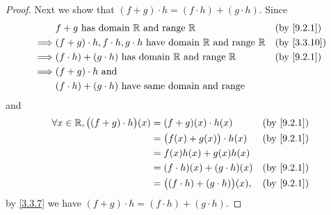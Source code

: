 \begin{proof}
  Next we show that \((f + g) \cdot h = (f \cdot h) + (g \cdot h)\).
  Since
  \begin{align*}
             & f + g \text{ has domain } \R \text{ and range } \R                                   &  & \text{(by \cref{9.2.1})}  \\
    \implies & (f + g) \cdot h, f \cdot h, g \cdot h  \text{ have domain } \R \text{ and range } \R &  & \text{(by \cref{3.3.10})} \\
    \implies & (f \cdot h) + (g \cdot h)  \text{ has domain } \R \text{ and range } \R              &  & \text{(by \cref{9.2.1})}  \\
    \implies & (f + g) \cdot h \text{ and }                                                                                        \\
             & (f \cdot h) + (g \cdot h) \text{ have same domain and range}
  \end{align*}
  and
  \begin{align*}
    \forall x \in \R, \big((f + g) \cdot h\big)(x) & = (f + g)(x) \cdot h(x)                   &  & \text{(by \cref{9.2.1})} \\
                                                   & = \big(f(x) + g(x)\big) \cdot h(x)        &  & \text{(by \cref{9.2.1})} \\
                                                   & = f(x)h(x) + g(x)h(x)                                                   \\
                                                   & = (f \cdot h)(x) + (g \cdot h)(x)         &  & \text{(by \cref{9.2.1})} \\
                                                   & = \big((f \cdot h) + (g \cdot h)\big)(x), &  & \text{(by \cref{9.2.1})}
  \end{align*}
  by \cref{3.3.7} we have \((f + g) \cdot h = (f \cdot h) + (g \cdot h)\).


\end{proof}
